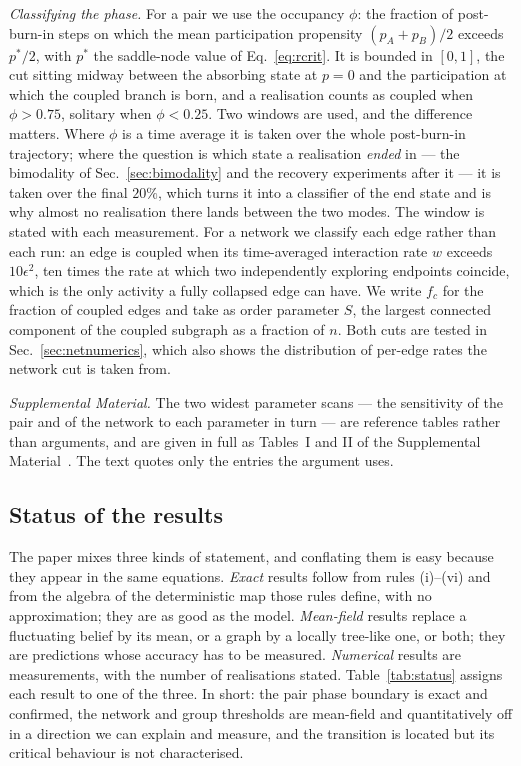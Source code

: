 \documentclass[aps,pre,twocolumn,superscriptaddress,floatfix,longbibliography]{revtex4-2}
\begin{document}
\emph{Classifying the phase.} For a pair we use the occupancy $\phi$: the
fraction of post-burn-in steps on which the mean participation propensity
$(p_A+p_B)/2$ exceeds $p^{*}/2$, with $p^{*}$ the saddle-node value of
Eq.~\eqref{eq:rcrit}. It is bounded in $[0,1]$, the cut sitting midway between
the absorbing state at $p=0$ and the participation at which the coupled branch is
born, and a realisation counts as coupled when $\phi>0.75$, solitary when
$\phi<0.25$. Two windows are used, and the difference matters. Where $\phi$ is a
time average it is taken over the whole post-burn-in trajectory; where the
question is which state a realisation \emph{ended} in --- the bimodality of
Sec.~\ref{sec:bimodality} and the recovery experiments after it --- it is taken
over the final $20\%$, which turns it into a classifier of the end state and is
why almost no realisation there lands between the two modes. The window is
stated with each measurement. For a network we classify each edge rather than
each run: an edge is coupled when its time-averaged interaction rate $w$ exceeds
$10\epsilon^{2}$, ten times the rate at which two independently exploring
endpoints coincide, which is the only activity a fully collapsed edge can have.
We write $f_c$ for the fraction of coupled edges and take as order parameter
$S$, the largest connected component of the coupled subgraph as a fraction of
$n$. Both cuts are tested in Sec.~\ref{sec:netnumerics}, which also shows the
distribution of per-edge rates the network cut is taken from.

\emph{Supplemental Material.} The two widest parameter scans --- the
sensitivity of the pair and of the network to each parameter in turn --- are
reference tables rather than arguments, and are given in full as
Tables~I and II of the Supplemental Material~\cite{SM}. The text quotes only the entries the argument uses.

\subsection[Status of the results]{Status of the results}
\label{sec:status}

The paper mixes three kinds of statement, and conflating them is easy
because they appear in the same equations. \emph{Exact} results follow from
rules (i)--(vi) and from the algebra of the deterministic map those rules define,
with no approximation; they are as good as the model. \emph{Mean-field} results
replace a fluctuating belief by its mean, or a graph by a locally tree-like one,
or both; they are predictions whose accuracy has to be measured.
\emph{Numerical} results are measurements, with the number of realisations
stated. Table~\ref{tab:status} assigns each result to one of the three. In short:
the pair phase boundary is exact and confirmed, the network and group thresholds
are mean-field and quantitatively off in a direction we can explain and measure,
and the transition is located but its critical behaviour is not characterised.
\end{document}
